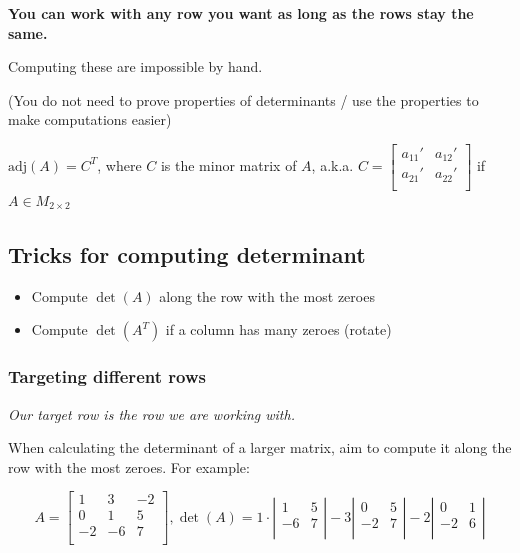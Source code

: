 \documentclass[12pt]{article}
\theoremstyle{plain}
\theoremstyle{remark}
\theoremstyle{definition}
\begin{document}
\textbf{You can work with any row you want as long as the rows stay the
same.}

Computing these are impossible by hand.

(You do not need to prove properties of determinants / use the
properties to make computations easier)

\(\text{adj}(A) = C^{T}\), where \(C\) is the minor matrix of \(A\),
a.k.a. \(C = \begin{bmatrix}
a_{11}' & a_{12}' \\
a_{21}' & a_{22}' \\
\end{bmatrix}\) if \(A \in M_{2 \times 2}\)


\subsection{Tricks for computing
determinant}

\begin{itemize}
\item
  Compute \(\det(A)\) along the row with the most zeroes
\item
  Compute \(\det\left( A^{T} \right)\) if a column has many zeroes
  (rotate)
\end{itemize}


\subsubsection{Targeting different
rows}

\emph{Our target row is the row we are working with.}

When calculating the determinant of a larger matrix, aim to compute it
along the row with the most zeroes. For example:

\[A = \begin{bmatrix}
1 & 3 & - 2 \\
0 & 1 & 5 \\
 - 2 & - 6 & 7 \\
\end{bmatrix},\det(A) = 1 \cdot \left| \begin{matrix}
1 & 5 \\
 - 6 & 7 \\
\end{matrix} \right| - 3\left| \begin{matrix}
0 & 5 \\
 - 2 & 7 \\
\end{matrix} \right| - 2\left| \begin{matrix}
0 & 1 \\
 - 2 & 6 \\
\end{matrix} \right|\]
\end{document}
